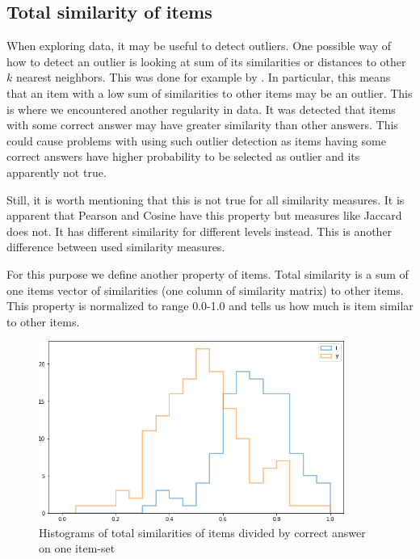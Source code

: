 \documentclass[
  digital, %
  table,   %
  nolof,     %
  nolot,     %
  nocover,
  color,
  final, %
]{fithesis3}
\begin{document}

\subsection{Total similarity of items}\label{total-similarity-of-items}

When exploring data, it may be useful to detect outliers. One possible way of how to detect an outlier is looking at sum of its similarities or distances to other $k$ nearest neighbors. This was done for example by \citeauthor{mitchell2014survey}\cite{mitchell2014survey}. In particular, this means that an item with a low sum of similarities to other items may be an outlier. This is where we encountered another regularity in data. It was detected that items with some correct answer may have greater similarity than other answers. This could cause problems with using such outlier detection as items having some correct answers have higher probability to be selected as outlier and its apparently not true.

Still, it is worth mentioning that this is not true for all similarity measures. It is apparent that Pearson and Cosine have this property but measures like Jaccard does not. It has different similarity for different levels instead. This is another difference between used similarity measures.

For this purpose we define another property of items. Total similarity is a sum of one items vector of similarities (one column of similarity matrix) to other items. This property is normalized to range 0.0-1.0 and tells us how much is item similar to other items.

\begin{figure}
  \includegraphics[width=10cm]{img/histogram_i_y}
  \caption{Histograms of total similarities of items divided by correct answer on one item-set}
  \label{fig:histogram_i_y}
\end{figure}
\end{document}
